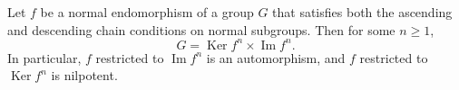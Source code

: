 Let $f$ be a normal endomorphism of a group $G$ that satisfies both the ascending and descending chain conditions on normal subgroups. Then for some $n \geq 1$,
$$G = \operatorname{Ker} f^n \times \operatorname{Im} f^n.$$
In particular, $f$ restricted to $\operatorname{Im} f^n$ is an automorphism, and $f$ restricted to $\operatorname{Ker} f^n$ is nilpotent.
